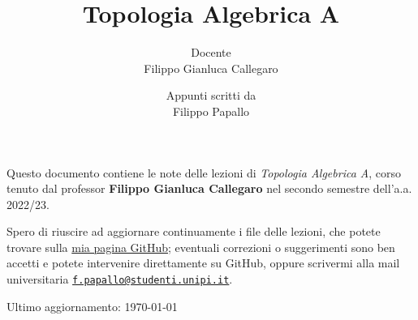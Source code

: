 \documentclass[a4paper, 10pt, oneside, DIV=9, chapterprefix=true, numbers=enddot,bibliography=totoc]{scrbook}
\title{Topologia Algebrica A}
\author{{\normalsize Docente}\\
	Filippo Gianluca Callegaro}
\date{{\normalsize Appunti scritti da}\\
	Filippo Papallo}
\begin{document}
\setlength{\parindent}{0pt}
\setlength{\parskip}{4pt}

\frontmatter
{}
\renewcommand{\thedummy}{\arabic{dummy}}
\maketitle
Questo documento contiene le note delle lezioni di \emph{Topologia Algebrica A},
corso tenuto dal professor \textbf{Filippo Gianluca Callegaro} nel secondo semestre
dell'a.a. 2022/23. 

Spero di riuscire ad aggiornare continuamente
i file delle lezioni, che potete trovare sulla 
\href{https://github.com/le-pap/Topologia-Algebrica-A}{mia pagina GitHub};
eventuali correzioni o suggerimenti sono ben accetti e potete intervenire direttamente
su GitHub, oppure scrivermi alla mail universitaria 
\href{mailto:f.papallo@studenti.unipi.it}{\texttt{f.papallo@studenti.unipi.it}}.

\hrulefill

Ultimo aggiornamento: \today
	
	
	
\tableofcontents
{}
\setcounter{llecture}{0}
\mainmatter{}
\renewcommand{\thedummy}{\thechapter.\arabic{dummy}}

\renewcommand{\thechapter}{\Roman{chapter}}

	

	

	

	
	
	

	

	

%	

%	

%	

%	

%	

%	

%	

%	

%	

%	

%	

%	


\nocite{*}


\backmatter{}
\printbibliography[heading=bibintoc, title={References}]
\end{document}
